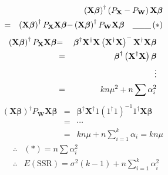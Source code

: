 \documentclass{article}
\begin{document}
\begin{eqnarray*}
&&\left( \mathbf{X\beta }\right) ^{\dagger }\left( P_{\mathbf{X}}-P_{\mathbf{%
W}}\right) \mathbf{X\beta } \\
&=&\left( \mathbf{X\beta }\right) ^{\dagger }P_{\mathbf{X}}\mathbf{X\beta -}%
\left( \mathbf{X\beta }\right) ^{\dagger }P_{\mathbf{W}}\mathbf{X\beta \quad
\_\_\_}\left( \ast \right)
\end{eqnarray*}%
\begin{eqnarray*}
\left( \mathbf{X\beta }\right) ^{\dagger }P_{\mathbf{X}}\mathbf{X\beta } &%
\mathbf{=}&\mathbf{\mathbf{\beta }^{\dagger }\mathbf{X^{\dagger }}X}\left( 
\mathbf{X}^{\dagger }\mathbf{X}\right) ^{-}\mathbf{X}^{\dagger }\mathbf{%
X\beta } \\
&=&\mathbf{\mathbf{\beta }^{\dagger }}\left( \mathbf{\mathbf{X^{\dagger }}X}%
\right) \mathbf{\beta } \\
&&\vdots \\
&=&kn\mu ^{2}+n\sum \alpha _{i}^{2}
\end{eqnarray*}%
\begin{eqnarray*}
\left( \mathbf{X\beta }\right) ^{\dagger }P_{\mathbf{W}}\mathbf{X\beta } &=&%
\mathbf{\mathbf{\beta }^{\dagger }\mathbf{X^{\dagger }}}1\left( 1^{\dagger
}1\right) ^{-1}1^{\dagger }\mathbf{X\beta } \\
&=&\cdots \\
&=&kn\mu +n\sum\limits_{i=1}^{k}\alpha _{i}=kn\mu
\end{eqnarray*}%
\begin{eqnarray*}
&\therefore &\left( \ast \right) =n\sum \alpha _{i}^{2} \\
&\therefore &E\left( \text{SSR}\right) =\sigma ^{2}\left( k-1\right)
+n\sum\limits_{i=1}^{k}\alpha _{i}^{2}
\end{eqnarray*}
\end{document}
